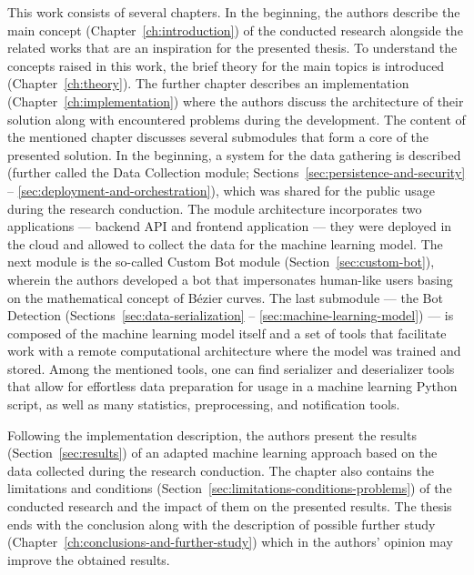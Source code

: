 This work consists of several chapters.
In the beginning, the authors describe the main concept (Chapter~\ref{ch:introduction}) of the conducted research alongside the related works that are an inspiration for the presented thesis.
To understand the concepts raised in this work, the brief theory for the main topics is introduced (Chapter~\ref{ch:theory}).
The further chapter describes an implementation (Chapter~\ref{ch:implementation}) where the authors discuss the architecture of their solution along with encountered problems during the development.
The content of the mentioned chapter discusses several submodules that form a core of the presented solution.
In the beginning, a system for the data gathering is described (further called the Data Collection module; Sections~\ref{sec:persistence-and-security} -- \ref{sec:deployment-and-orchestration}), which was shared for the public usage during the research conduction.
The module architecture incorporates two applications --- backend API and frontend application --- they were deployed in the cloud and allowed to collect the data for the machine learning model.
The next module is the so-called Custom Bot module (Section~\ref{sec:custom-bot}), wherein the authors developed a bot that impersonates human-like users basing on the mathematical concept of Bézier curves.
The last submodule --- the Bot Detection (Sections~\ref{sec:data-serialization} -- \ref{sec:machine-learning-model}) --- is composed of the machine learning model itself and a set of tools that facilitate work with a remote computational architecture where the model was trained and stored.
Among the mentioned tools, one can find serializer and deserializer tools that allow for effortless data preparation for usage in a machine learning Python script, as well as many statistics, preprocessing, and notification tools.

Following the implementation description, the authors present the results (Section~\ref{sec:results}) of an adapted machine learning approach based on the data collected during the research conduction.
The chapter also contains the limitations and conditions (Section~\ref{sec:limitations-conditions-problems}) of the conducted research and the impact of them on the presented results.
The thesis ends with the conclusion along with the description of possible further study (Chapter~\ref{ch:conclusions-and-further-study}) which in the authors' opinion may improve the obtained results.